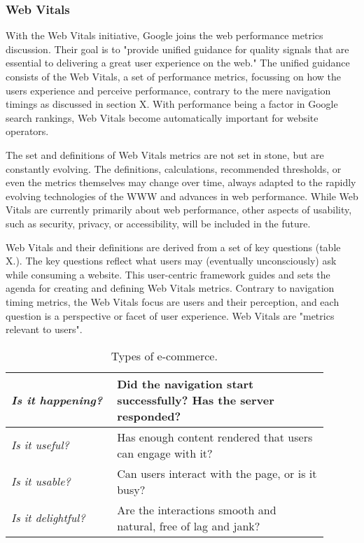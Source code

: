 

\subsubsection{Web Vitals}



With the Web Vitals initiative, Google joins the web performance metrics discussion.
Their goal is to "provide unified guidance for quality signals that are essential to delivering a great user experience on the web." %
The unified guidance consists of the Web Vitals, a set of performance metrics, focussing on how the users experience and perceive performance, contrary to the mere navigation timings as discussed in section X.
With performance being a factor in Google search rankings, Web Vitals become automatically important for website operators. %


The set and definitions of Web Vitals metrics are not set in stone, but are constantly evolving.
The definitions, calculations, recommended thresholds, or even the metrics themselves may change over time, always adapted to the rapidly evolving technologies of the WWW and advances in web performance. %
While Web Vitals are currently primarily about web performance, other aspects of usability, such as security, privacy, or accessibility, will be included in the future. %


Web Vitals and their definitions are derived from a set of key questions (table X.).
The key questions reflect what users may (eventually unconsciously) ask while consuming a website. 
This user-centric framework guides and sets the agenda for creating and defining Web Vitals metrics.
Contrary to navigation timing metrics, the Web Vitals focus are users and their perception, and each question is a perspective or facet of user experience.
Web Vitals are "metrics relevant to users". %

\begin{table}[h]
	\small
	\centering
	\begin{tabular}{ p{0.3\linewidth} | p{0.6\linewidth} }
	\textit{Is it happening?} & Did the navigation start successfully? Has the server responded? \\
	\hline
	\textit{Is it useful?} & Has enough content rendered that users can engage with it? \\
	\hline
	\textit{Is it usable?} & Can users interact with the page, or is it busy? \\
	\hline
	\textit{Is it delightful?} & Are the interactions smooth and natural, free of lag and jank? \\
	\end{tabular}
	\medskip
	\caption{Types of e-commerce.}
	\label{table:types_ecommerce}
\end{table}


